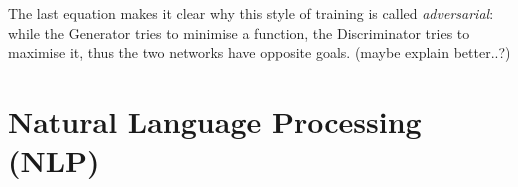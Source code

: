\documentclass[12pt,a4paper]{book}
\theoremstyle{definition}
\begin{document}
	The last equation makes it clear why this style of training is called \textit{adversarial}: while the Generator tries to minimise a function, the Discriminator tries to maximise it, thus the two networks have opposite goals. (maybe explain better..?)
	
	\section{Natural Language Processing (NLP)}
	
	{}
	
	
\end{document}

